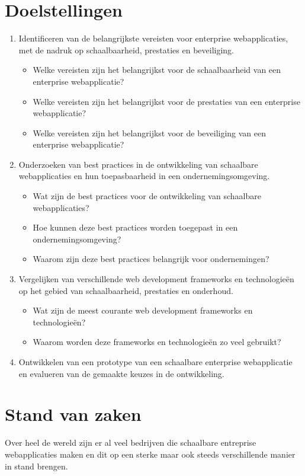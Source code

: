 \documentclass{hogent-article}
\begin{document}
\section{Doelstellingen}
\begin{enumerate}
  \item Identificeren van de belangrijkste vereisten voor enterprise webapplicaties, met de nadruk op schaalbaarheid, prestaties en beveiliging.
    \begin{itemize}
      \item Welke vereisten zijn het belangrijkst voor de schaalbaarheid van een enterprise webapplicatie?
      \item Welke vereisten zijn het belangrijkst voor de prestaties van een enterprise webapplicatie?
      \item Welke vereisten zijn het belangrijkst voor de beveiliging van een enterprise webapplicatie?
    \end{itemize}
  \item Onderzoeken van best practices in de ontwikkeling van schaalbare webapplicaties en hun toepasbaarheid in een ondernemingsomgeving.
    \begin{itemize}
      \item Wat zijn de best practices voor de ontwikkeling van schaalbare webapplicaties?
      \item Hoe kunnen deze best practices worden toegepast in een ondernemingsomgeving?
      \item Waarom zijn deze best practices belangrijk voor ondernemingen?
    \end{itemize}
  \item Vergelijken van verschillende web development frameworks en technologieën op het gebied van schaalbaarheid, prestaties en onderhoud.
    \begin{itemize}
      \item Wat zijn de meest courante web development frameworks en technologieën?
      \item Waarom worden deze frameworks en technologieën zo veel gebruikt?
    \end{itemize}
  \item Ontwikkelen van een prototype van een schaalbare enterprise webapplicatie en evalueren van de gemaakte keuzes in de ontwikkeling.
\end{enumerate}

\section{Stand van zaken}
Over heel de wereld zijn er al veel bedrijven die schaalbare entreprise webapplicaties maken en dit op een sterke maar ook steeds verschillende manier in stand brengen.
\end{document}
